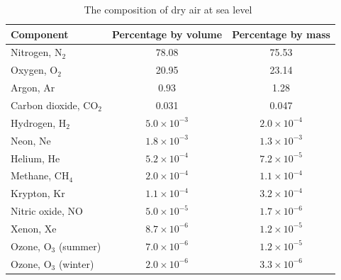 \documentclass[../main]{subfiles}
\begin{document}


\vspace{0mm}
\begin{table}[H]
    \centering
    \begin{tabular}{l c c}
        \toprule
        \textbf{Component} & \textbf{Percentage by volume} & \textbf{Percentage by mass} \\
        \midrule
        Nitrogen, N$_2$ & 78.08 & 75.53 \\
        Oxygen, O$_2$ & 20.95 & 23.14 \\
        Argon, Ar & 0.93 & 1.28 \\
        Carbon dioxide, CO$_2$ & 0.031 & 0.047 \\
        Hydrogen, H$_2$ & $5.0 \times 10^{-3}$ & $2.0 \times 10^{-4}$ \\
        Neon, Ne & $1.8 \times 10^{-3}$ & $1.3 \times 10^{-3}$ \\
        Helium, He & $5.2 \times 10^{-4}$ & $7.2 \times 10^{-5}$ \\
        Methane, CH$_4$ & $2.0 \times 10^{-4}$ & $1.1 \times 10^{-4}$ \\
        Krypton, Kr & $1.1 \times 10^{-4}$ & $3.2 \times 10^{-4}$ \\
        Nitric oxide, NO & $5.0 \times 10^{-5}$ & $1.7 \times 10^{-6}$ \\
        Xenon, Xe & $8.7 \times 10^{-6}$ & $1.2 \times 10^{-5}$ \\
        Ozone, O$_3$ (summer) & $7.0 \times 10^{-6}$ & $1.2 \times 10^{-5}$ \\
        Ozone, O$_3$ (winter) & $2.0 \times 10^{-6}$ & $3.3 \times 10^{-6}$ \\
        \bottomrule
    \end{tabular}
    \caption{The composition of dry air at sea level~\cite{Atkins2022AtkinsPhysical}}
    \label{t:air_composition}
\end{table}
\FloatBarrier
\vspace{0mm}
\end{document}
